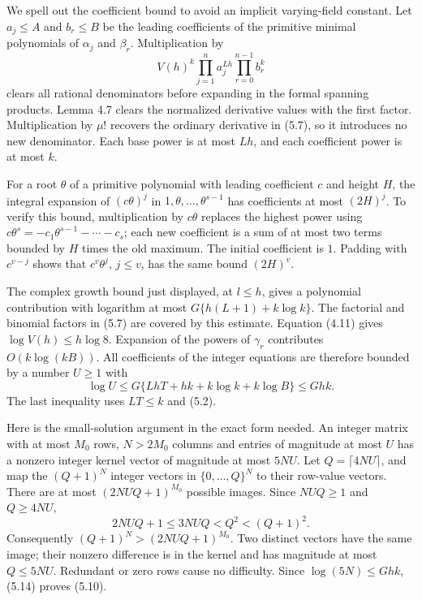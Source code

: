 \documentclass[
  11pt,
  a4paper,
]{article}
\begin{document}
We spell out the coefficient bound to avoid an implicit varying-field
constant. Let \(a_j\le A\) and \(b_r\le B\) be the leading coefficients
of the primitive minimal polynomials of \(\alpha_j\) and \(\beta_r\).
Multiplication by \[
V(h)^k\prod_{j=1}^n a_j^{Lh}
\prod_{r=0}^{n-1}b_r^k \tag{5.13}
\] clears all rational denominators before expanding in the formal
spanning products. Lemma 4.7 clears the normalized derivative values
with the first factor. Multiplication by \(\mu!\) recovers the ordinary
derivative in (5.7), so it introduces no new denominator. Each base
power is at most \(Lh\), and each coefficient power is at most \(k\).

For a root \(\theta\) of a primitive polynomial with leading coefficient
\(c\) and height \(H\), the integral expansion of \((c\theta)^j\) in
\(1,\theta,\ldots,\theta^{s-1}\) has coefficients at most \((2H)^j\). To
verify this bound, multiplication by \(c\theta\) replaces the highest
power using \(c\theta^s=-c_1\theta^{s-1}-\cdots-c_s\); each new
coefficient is a sum of at most two terms bounded by \(H\) times the old
maximum. The initial coefficient is \(1\). Padding with \(c^{v-j}\)
shows that \(c^v\theta^j\), \(j\le v\), has the same bound \((2H)^v\).

The complex growth bound just displayed, at \(l\le h\), gives a
polynomial contribution with logarithm at most \(G\{h(L+1)+k\log k\}\).
The factorial and binomial factors in (5.7) are covered by this
estimate. Equation (4.11) gives \(\log V(h)\le h\log8\). Expansion of
the powers of \(\gamma_r\) contributes \(O(k\log(kB))\). All
coefficients of the integer equations are therefore bounded by a number
\(U\ge1\) with \[
\log U\le G\{LhT+hk+k\log k+k\log B\}\le Ghk. \tag{5.14}
\] The last inequality uses \(LT\le k\) and (5.2).

Here is the small-solution argument in the exact form needed. An integer
matrix with at most \(M_0\) rows, \(N>2M_0\) columns and entries of
magnitude at most \(U\) has a nonzero integer kernel vector of magnitude
at most \(5NU\). Let \(Q=\lceil4NU\rceil\), and map the \((Q+1)^N\)
integer vectors in \(\{0,\ldots,Q\}^N\) to their row-value vectors.
There are at most \((2NUQ+1)^{M_0}\) possible images. Since \(NUQ\ge1\)
and \(Q\ge4NU\), \[
2NUQ+1\le3NUQ<Q^2<(Q+1)^2.
\] Consequently \((Q+1)^N>(2NUQ+1)^{M_0}\). Two distinct vectors have
the same image; their nonzero difference is in the kernel and has
magnitude at most \(Q\le5NU\). Redundant or zero rows cause no
difficulty. Since \(\log(5N)\le Ghk\), (5.14) proves (5.10).
\end{document}
